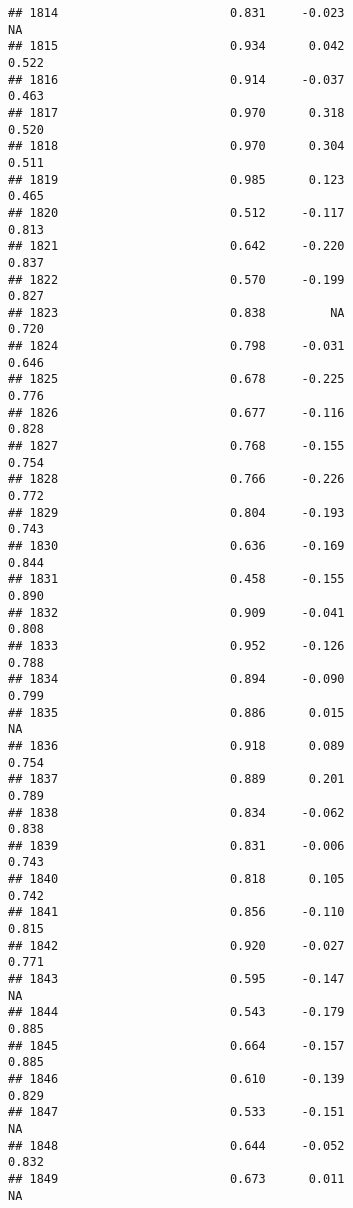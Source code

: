 \documentclass[
]{article}
\begin{document}
\begin{verbatim}
## 1814                        0.831     -0.023                        NA
## 1815                        0.934      0.042                     0.522
## 1816                        0.914     -0.037                     0.463
## 1817                        0.970      0.318                     0.520
## 1818                        0.970      0.304                     0.511
## 1819                        0.985      0.123                     0.465
## 1820                        0.512     -0.117                     0.813
## 1821                        0.642     -0.220                     0.837
## 1822                        0.570     -0.199                     0.827
## 1823                        0.838         NA                     0.720
## 1824                        0.798     -0.031                     0.646
## 1825                        0.678     -0.225                     0.776
## 1826                        0.677     -0.116                     0.828
## 1827                        0.768     -0.155                     0.754
## 1828                        0.766     -0.226                     0.772
## 1829                        0.804     -0.193                     0.743
## 1830                        0.636     -0.169                     0.844
## 1831                        0.458     -0.155                     0.890
## 1832                        0.909     -0.041                     0.808
## 1833                        0.952     -0.126                     0.788
## 1834                        0.894     -0.090                     0.799
## 1835                        0.886      0.015                        NA
## 1836                        0.918      0.089                     0.754
## 1837                        0.889      0.201                     0.789
## 1838                        0.834     -0.062                     0.838
## 1839                        0.831     -0.006                     0.743
## 1840                        0.818      0.105                     0.742
## 1841                        0.856     -0.110                     0.815
## 1842                        0.920     -0.027                     0.771
## 1843                        0.595     -0.147                        NA
## 1844                        0.543     -0.179                     0.885
## 1845                        0.664     -0.157                     0.885
## 1846                        0.610     -0.139                     0.829
## 1847                        0.533     -0.151                        NA
## 1848                        0.644     -0.052                     0.832
## 1849                        0.673      0.011                        NA

\end{verbatim}
\end{document}
